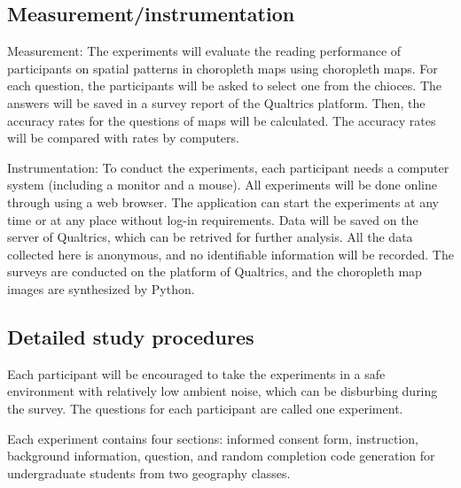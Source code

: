\subsection{Measurement/instrumentation}

Measurement: The experiments will evaluate the reading performance of participants on spatial patterns in choropleth maps using choropleth maps. For each question, the participants will be asked to select one from the chioces. The answers will be saved in a survey report of the Qualtrics platform. Then, the accuracy rates for the questions of maps will be calculated. The accuracy rates will be compared with rates by computers.

Instrumentation: To conduct the experiments, each participant needs a computer system (including a monitor and a mouse). All experiments will be done online through using a web browser. The application can start the experiments at any time or at any place without log-in requirements. Data will be saved on the server of Qualtrics, which can be retrived for further analysis. All the data collected here is anonymous, and no identifiable information will be recorded. The surveys are conducted on the platform of Qualtrics, and the choropleth map images are synthesized by Python. 


\subsection{Detailed study procedures}

Each participant will be encouraged to take the experiments in a safe environment with relatively low ambient noise, which can be disburbing during the survey. The questions for each participant are called one experiment.   

Each experiment contains four sections: informed consent form, instruction, background information, question, and random completion code generation for undergraduate students from two geography classes.

